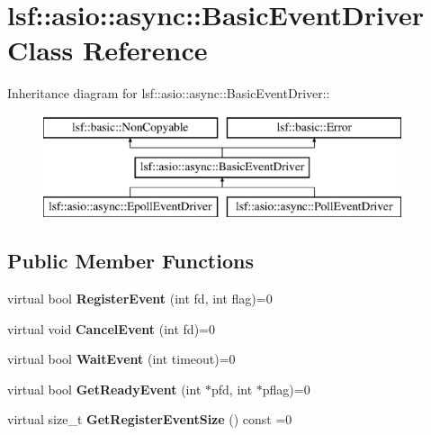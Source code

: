 \hypertarget{classlsf_1_1asio_1_1async_1_1BasicEventDriver}{
\section{lsf::asio::async::BasicEventDriver Class Reference}
\label{classlsf_1_1asio_1_1async_1_1BasicEventDriver}
}
Inheritance diagram for lsf::asio::async::BasicEventDriver::\begin{figure}[H]
\begin{center}
\leavevmode
\includegraphics[height=3cm]{classlsf_1_1asio_1_1async_1_1BasicEventDriver}
\end{center}
\end{figure}
\subsection*{Public Member Functions}
\begin{DoxyCompactItemize}
\item 
\hypertarget{classlsf_1_1asio_1_1async_1_1BasicEventDriver_a1383d09647e8ff8bfb601ea215d0053c}{
virtual bool {\bfseries RegisterEvent} (int fd, int flag)=0}
\label{classlsf_1_1asio_1_1async_1_1BasicEventDriver_a1383d09647e8ff8bfb601ea215d0053c}

\item 
\hypertarget{classlsf_1_1asio_1_1async_1_1BasicEventDriver_a6f943700894a78389fe707bf3b20cb04}{
virtual void {\bfseries CancelEvent} (int fd)=0}
\label{classlsf_1_1asio_1_1async_1_1BasicEventDriver_a6f943700894a78389fe707bf3b20cb04}

\item 
\hypertarget{classlsf_1_1asio_1_1async_1_1BasicEventDriver_ae9328691522910a3103f057d6fe8e78f}{
virtual bool {\bfseries WaitEvent} (int timeout)=0}
\label{classlsf_1_1asio_1_1async_1_1BasicEventDriver_ae9328691522910a3103f057d6fe8e78f}

\item 
\hypertarget{classlsf_1_1asio_1_1async_1_1BasicEventDriver_a6c3620bae71f7d54828fbd3ebcd879a8}{
virtual bool {\bfseries GetReadyEvent} (int $\ast$pfd, int $\ast$pflag)=0}
\label{classlsf_1_1asio_1_1async_1_1BasicEventDriver_a6c3620bae71f7d54828fbd3ebcd879a8}

\item 
\hypertarget{classlsf_1_1asio_1_1async_1_1BasicEventDriver_a65e6e53f1b0bce5cd9446c179abe0945}{
virtual size\_\-t {\bfseries GetRegisterEventSize} () const =0}
\label{classlsf_1_1asio_1_1async_1_1BasicEventDriver_a65e6e53f1b0bce5cd9446c179abe0945}

\end{DoxyCompactItemize}
